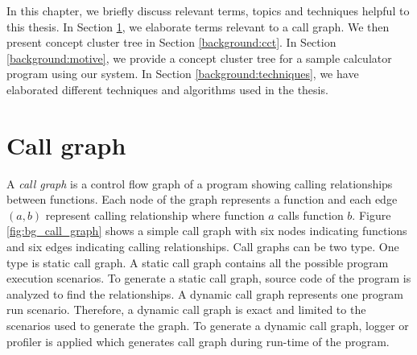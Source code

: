 
\label{chapter:background}

In this chapter, we briefly discuss relevant terms, topics and techniques helpful to this thesis. In Section \ref{background:call_graph}, we elaborate terms relevant to a call graph. We then present concept cluster tree in Section \ref{background:cct}. In Section \ref{background:motive}, we provide a concept cluster tree for a sample calculator program using our system. In Section \ref{background:techniques}, we have elaborated different techniques and algorithms used in the thesis. 

\section{Call graph}
\label{background:call_graph}
A \emph{call graph} is a control flow graph of a program showing calling relationships between functions. Each node of the graph represents a function and each edge $(a, b)$ represent calling relationship where function $a$ calls function $b$. Figure \ref{fig:bg_call_graph} shows a simple call graph with six nodes indicating functions and six edges indicating calling relationships. Call graphs can be two type. One type is static call graph. A static call graph contains all the possible program execution scenarios. To generate a static call graph, source code of the program is analyzed to find the relationships. A dynamic call graph represents one program run scenario. Therefore, a dynamic call graph is exact and limited to the scenarios used to generate the graph. To generate a dynamic call graph, logger or profiler is applied which generates call graph during run-time of the program.


